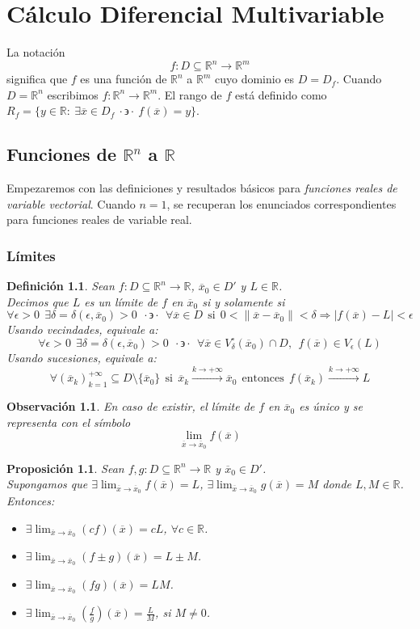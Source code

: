 \documentclass[11pt]{report}
\newtheorem{definition}{Definición}[section]
\newtheorem{observation}{Observación}[section]
\newtheorem{proposition}{Proposición}[section]
\newcommand{\Rn}{\mathbb{R}^{n}}
\newcommand{\Rm}{\mathbb{R}^{m}}
\newcommand{\R}{\mathbb{R}}
\newcommand{\x}{\overline{x}}
\newcommand{\xz}{\overline{x}_{0}}
\newcommand{\tq}{\cdot\backepsilon\cdot}
\begin{document}
\chapter{Cálculo Diferencial Multivariable}
La notación
$$f:D\subseteq\Rn\rightarrow\Rm$$
significa que $f$ es una función de $\Rn$ a $\Rm$ cuyo dominio es $D=D_{f}$. Cuando $D=\Rn$ escribimos $f:\Rn\rightarrow\Rm$. El rango de $f$ está definido como $R_{f}=\{y\in\R:\ \exists\x\in D_{f}\ \tq\ f(\x)=y\}$.
\section{Funciones de $\Rn$ a $\R$}
Empezaremos con las definiciones y resultados básicos para \emph{funciones reales de variable vectorial}. Cuando $n=1$, se recuperan los enunciados correspondientes para funciones reales de variable real.

\subsection{Límites}

\begin{definition} Sean $f:D\subseteq\Rn\rightarrow\R$, $\xz\in D'$ y $L\in\R$.\\
Decimos que $L$ es un límite de $f$ en $\xz$ si y solamente si
$$\forall\epsilon>0\ \ \exists\delta=\delta(\epsilon, \xz)>0\ \ \tq\ \ \forall\x\in D\ \ \text{si}\ \ 0<\| \x-\xz \|<\delta\Rightarrow|f(\x)-L|<\epsilon$$
Usando vecindades, equivale a:
$$\forall\epsilon>0\ \ \exists\delta=\delta(\epsilon, \xz)>0\ \ \tq\ \ \forall\x\in V_{\delta}^{\circ}(\xz)\cap D,\ \ f(\x)\in V_{\epsilon}(L)$$
Usando sucesiones, equivale a:
$$\forall(\x_{k})_{k=1}^{+\infty}\subseteq D\setminus\{\xz\}\ \ \text{si}\ \ \x_{k}\xrightarrow{k\rightarrow+\infty}\xz\ \ \text{entonces}\ \ f(\x_{k})\xrightarrow{k\rightarrow+\infty}L$$
\end{definition}

\begin{observation}
En caso de existir, el límite de $f$ en $\xz$ es único y se representa con el símbolo
$$\lim_{\x\to\xz}f(\x)$$
\end{observation}

\begin{proposition}
Sean $f, g:D\subseteq\Rn\rightarrow\R$ y $\xz\in D'$.\\
Supongamos que $\exists\lim_{\x\to\xz}f(\x)=L$, $\exists\lim_{\x\to\xz}g(\x)=M$ donde $L, M\in\R$. Entonces:
\begin{itemize}
\item[(i)] $\exists\lim_{\x\to\xz}(cf)(\x)=cL$, $\forall c\in\R$.
\item[(ii)] $\exists\lim_{\x\to\xz}(f\pm g)(\x)=L\pm M$.
\item[(iii)] $\exists\lim_{\x\to\xz}(fg)(\x)=LM$.
\item[(iv)] $\exists\lim_{\x\to\xz}\left(\frac{f}{g}\right)(\x)=\frac{L}{M}$, si $M\ne0$.
\end{itemize}
\end{proposition}
\end{document}

